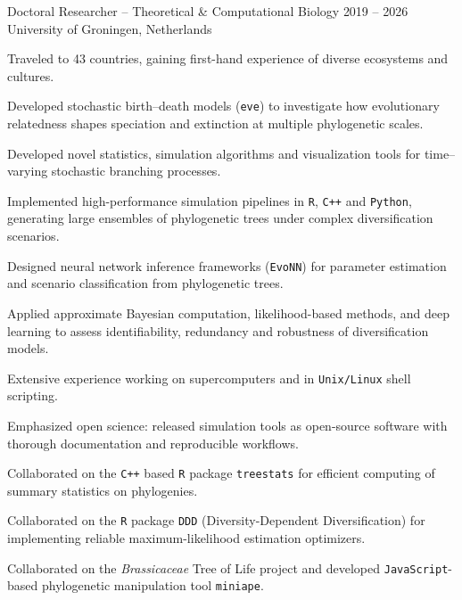 \cventry
  {Doctoral Researcher -- Theoretical \& Computational Biology}
  {2019 -- 2026}
  {University of Groningen, Netherlands}
  {%
   \begin{expitem}
     \item Traveled to 43 countries, gaining first-hand experience of diverse ecosystems and cultures.
     \item Developed stochastic birth--death models (\texttt{eve}) to investigate how evolutionary relatedness shapes speciation and extinction at multiple phylogenetic scales.
     \item Developed novel statistics, simulation algorithms and visualization tools for time--varying stochastic branching processes.
     \item Implemented high-performance simulation pipelines in \texttt{R}, \texttt{C++} and \texttt{Python}, generating large ensembles of phylogenetic trees under complex diversification scenarios.
     \item Designed neural network inference frameworks (\texttt{EvoNN}) for parameter estimation and scenario classification from phylogenetic trees.
     \item Applied approximate Bayesian computation, likelihood-based methods, and deep learning to assess identifiability, redundancy and robustness of diversification models.
     \item Extensive experience working on supercomputers and in \texttt{Unix/Linux} shell scripting.
     \item Emphasized open science: released simulation tools as open-source software with thorough documentation and reproducible workflows.
     \item Collaborated on the \texttt{C++} based \texttt{R} package \texttt{treestats} for efficient computing of summary statistics on phylogenies.
     \item Collaborated on the \texttt{R} package \texttt{DDD} (Diversity-Dependent Diversification) for implementing reliable maximum-likelihood estimation optimizers.
     \item Collaborated on the \textit{Brassicaceae} Tree of Life project and developed \texttt{JavaScript}-based phylogenetic manipulation tool \texttt{miniape}.
   \end{expitem}
  }

